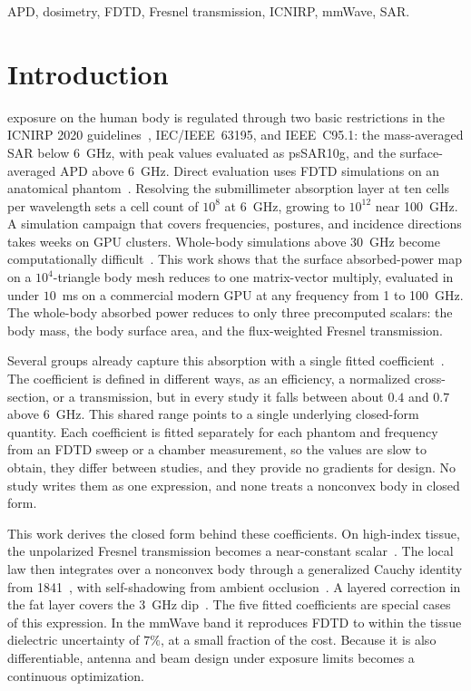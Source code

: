 \documentclass[journal,twocolumn,10pt]{IEEEtran}
\theoremstyle{plain}
\begin{document}
\begin{IEEEkeywords}
APD, dosimetry, FDTD, Fresnel transmission, ICNIRP, mmWave, SAR.
\end{IEEEkeywords}

\IEEEpeerreviewmaketitle

\section{Introduction}\label{sec:introduction}

 exposure on the human body is regulated
through two basic restrictions in the \gls{ICNIRP} 2020
guidelines~\cite{ICNIRP2020}, IEC/IEEE~63195, and IEEE~C95.1: the
mass-averaged \gls{SAR} below 6~GHz, with peak values evaluated as
\gls{psSAR10g}, and the surface-averaged \gls{APD} above 6~GHz. Direct evaluation uses
\gls{FDTD} simulations on an anatomical
phantom~\cite{Kodera2024,Diao2024,Hirata2021,Wydaeghe2026}. Resolving the submillimeter
absorption layer at ten cells per wavelength
sets a cell count of $10^{8}$ at 6~GHz, growing to $10^{12}$ near
100~GHz. A simulation campaign that covers frequencies, postures, and
incidence directions takes weeks on \gls{GPU} clusters. Whole-body
simulations above 30~GHz become computationally difficult~\cite{Wydaeghe2026}.
This work shows that the surface absorbed-power map on a
$10^4$-triangle body mesh reduces to one matrix-vector multiply,
evaluated in under $10$~ms on a commercial modern GPU at any
frequency from 1 to 100~GHz. The whole-body absorbed power
reduces to only three precomputed scalars: the body mass, the
body surface area, and the flux-weighted Fresnel transmission.

Several groups already capture this absorption with a single fitted
coefficient~\cite{Bamba2014,Flintoft2014,Zhang2017thesis,ZhangRobinson2020,Kodera2024,Diao2024}.
The coefficient is defined in different ways, as an efficiency, a
normalized cross-section, or a transmission, but in every study it
falls between about $0.4$ and $0.7$ above $6$~GHz. This shared range
points to a single underlying closed-form quantity. Each coefficient
is fitted separately for each phantom and frequency from an \gls{FDTD}
sweep or a chamber measurement, so the values are slow to obtain, they
differ between studies, and they provide no gradients for design. No
study writes them as one expression, and none treats a nonconvex body
in closed form.

This work derives the closed form behind these coefficients. On
high-index tissue, the unpolarized Fresnel transmission becomes a
near-constant scalar~\cite{Azzam2015}. The local law then integrates
over a nonconvex body through a generalized Cauchy identity
from 1841~\cite{Cauchy1841}, with self-shadowing from ambient
occlusion~\cite{Zhukov1998,Landis2002,AkenineMoller2018}. A layered
correction in the fat layer covers the $3$~GHz dip~\cite{Flintoft2014}.
The five fitted coefficients are special cases of this expression. In
the mmWave band it reproduces \gls{FDTD} to within the tissue
dielectric uncertainty of $7\%$, at a small fraction of the cost. Because it is
also differentiable, antenna and beam design under exposure limits
becomes a continuous optimization.
\end{document}
